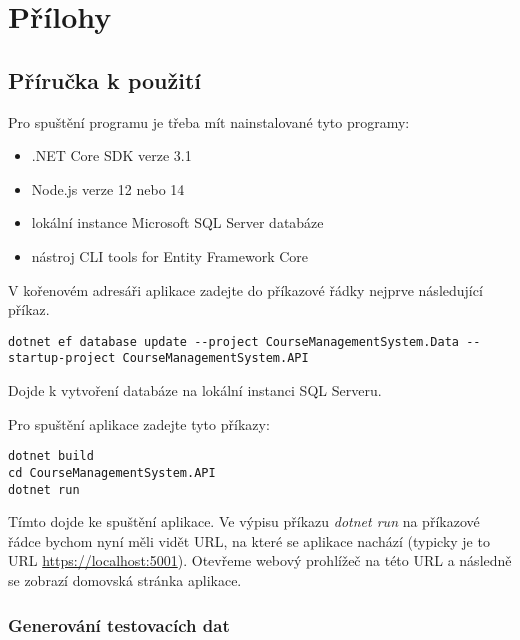 \documentclass[12pt,a4paper]{report}
\let\openright=\clearpage
\begin{document}
\chapter{Přílohy}

\section{Příručka k použití}

Pro spuštění programu je třeba mít nainstalované tyto programy:
\begin{itemize}
	\item .NET Core SDK verze 3.1
	\item Node.js verze 12 nebo 14
	\item lokální instance Microsoft SQL Server databáze
	\item nástroj CLI tools for Entity Framework Core
\end{itemize}

V kořenovém adresáři aplikace zadejte do příkazové řádky nejprve následující příkaz.

\begin{lstlisting}
dotnet ef database update --project CourseManagementSystem.Data --startup-project CourseManagementSystem.API
\end{lstlisting}

Dojde k vytvoření databáze na lokální instanci SQL Serveru.

Pro spuštění aplikace zadejte tyto příkazy:
\begin{lstlisting}
dotnet build
cd CourseManagementSystem.API
dotnet run
\end{lstlisting}

Tímto dojde ke spuštění aplikace. Ve výpisu příkazu \textit{dotnet run} na příkazové řádce bychom nyní měli vidět URL, na které se aplikace nachází (typicky je to URL \url{https://localhost:5001}). Otevřeme webový prohlížeč na této URL a následně se zobrazí domovská stránka aplikace.

\subsection{Generování testovacích dat}



\openright
\end{document}

